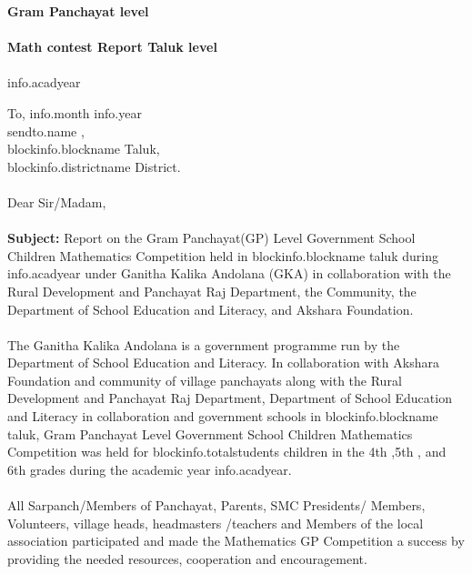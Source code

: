 \documentclass[12pt]{article}
\begin{document}
\begin{titlepage}
    \thispagestyle{title}
    \begin{center}
    \vspace*{10.5cm}
     \textbf{\huge Gram Panchayat level} \\~\\
        \textbf{\huge Math contest Report Taluk level} \\~\\
	    \Large{{info.acadyear}}
    \end{center}
\end{titlepage}
\pagebreak

\thispagestyle{plain}
{
\setlength{\parindent}{0in}
To, \hfill  {{info.month}} {{info.year}} \\ [2ex]
{{sendto.name}} ,\\ [1ex]
{{blockinfo.blockname}} Taluk,\\ [1ex]
{{blockinfo.districtname}} District.
\\~\\ [3ex]
Dear Sir/Madam,
\\~\\
\textbf{Subject:} Report on the Gram Panchayat(GP)  Level Government School Children Mathematics Competition held in {{blockinfo.blockname}} taluk during {{info.acadyear}} under Ganitha Kalika Andolana (GKA) in collaboration with the Rural Development and Panchayat Raj Department, the Community, the Department of School Education and Literacy, and Akshara Foundation.
\\~\\[3ex]
The Ganitha Kalika Andolana is a government programme run by the Department of School Education and Literacy. In collaboration with Akshara Foundation and community of village panchayats along with the Rural Development and Panchayat Raj Department, Department of School Education and Literacy in collaboration and  government schools in {{blockinfo.blockname}} taluk, Gram Panchayat Level Government School Children Mathematics Competition was held for {{blockinfo.totalstudents}} children in the 4th ,5th , and 6th  grades during the academic year {{info.acadyear}}.
\\~\\[2ex]
All Sarpanch/Members of Panchayat, Parents, SMC Presidents/ Members, Volunteers, village heads, headmasters /teachers and Members of the local association participated and made the Mathematics GP Competition a success by providing the needed  resources, cooperation and encouragement.
\\~\\[2ex]
}
\end{document}
